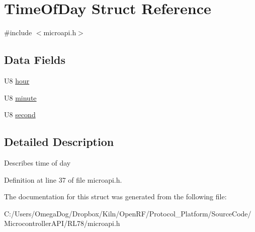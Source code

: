 \hypertarget{struct_time_of_day}{\section{Time\-Of\-Day Struct Reference}
\label{struct_time_of_day}
}


{\ttfamily \#include $<$microapi.\-h$>$}

\subsection*{Data Fields}
\begin{DoxyCompactItemize}
\item 
U8 \hyperlink{group___microcontroller_gaa4f95286ba64d87b1d69c7bf2ce4db6d}{hour}
\item 
U8 \hyperlink{group___microcontroller_ga21ec20909874235c6b6962ce326411d9}{minute}
\item 
U8 \hyperlink{group___microcontroller_ga98c2745c67f408461639d09e76db81b5}{second}
\end{DoxyCompactItemize}


\subsection{Detailed Description}
Describes time of day 

Definition at line 37 of file microapi.\-h.



The documentation for this struct was generated from the following file\-:\begin{DoxyCompactItemize}
\item 
C\-:/\-Users/\-Omega\-Dog/\-Dropbox/\-Kiln/\-Open\-R\-F/\-Protocol\-\_\-\-Platform/\-Source\-Code/\-Microcontroller\-A\-P\-I/\-R\-L78/microapi.\-h\end{DoxyCompactItemize}
